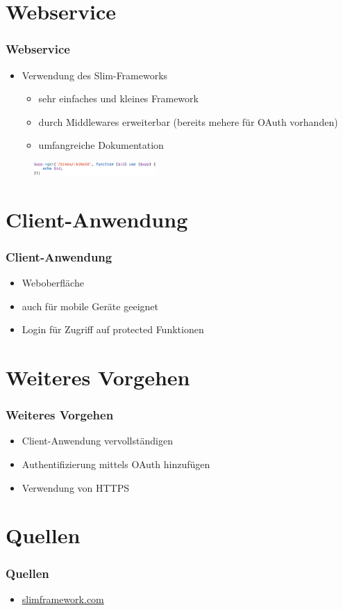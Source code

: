 \section{Webservice}
\begin{frame}
	\frametitle*{Webservice}
	\begin{itemize}
		\item Verwendung des Slim-Frameworks
		\begin{itemize}
			\item sehr einfaches und kleines Framework
			\item durch Middlewares erweiterbar (bereits mehere für OAuth vorhanden)
			\item umfangreiche Dokumentation
		\end{itemize}
	\end{itemize}
\begin{figure}
		\centering
		\includegraphics[height=5mm]{pics/slim.png}
	\end{figure}
\end{frame}

\section{Client-Anwendung}
\begin{frame}
	\frametitle*{Client-Anwendung}
	\begin{itemize}
		\item Weboberfläche
		\item auch für mobile Geräte geeignet
		\item Login für Zugriff auf protected Funktionen
	\end{itemize}
\end{frame}

\section{Weiteres Vorgehen}
\begin{frame}
	\frametitle*{Weiteres Vorgehen}
	\begin{itemize}
		\item Client-Anwendung vervollständigen
		\item Authentifizierung mittels OAuth hinzufügen
		\item Verwendung von HTTPS
	\end{itemize}
\end{frame}

\section{Quellen}
\begin{frame}
	\frametitle*{Quellen}
	\begin{itemize}
		\item \url{slimframework.com}
	\end{itemize}
\end{frame}
